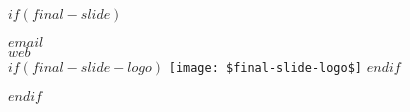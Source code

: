 $if(final-slide)$
\begin{frame}
\begin{centering}
\vfill
\faEnvelope \; \textbf{$email$} \\
\vspace{10pt}
\faGlobe \; \textbf{$web$} \\
\vspace{20pt}
$if(final-slide-logo)$
  \texttt{[image: \$final-slide-logo\$]}
$endif$
\vfill
\end{centering}
\end{frame}
$endif$
